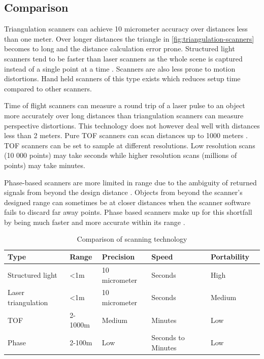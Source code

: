 \subsection{Comparison}

Triangulation scanners can achieve 10 micrometer accuracy over distances less than one meter. Over longer distances the triangle in \autoref{fig:triangulation-scanners} becomes to long and the distance calculation error prone. Structured light scanners tend to be faster than laser scanners as the whole scene is captured instead of a single point at a time \cite{Brown2012}. Scanners are also less prone to motion distortions. Hand held scanners of this type exists which reduces setup time compared to other scanners.

Time of flight scanners can measure a round trip of a laser pulse to an object more accurately over long distances than triangulation scanners can measure perspective distortions. This technology does not however deal well with distances less than 2 meters. Pure TOF scanners can scan distances up to 1000 meters \cite{Form2014}. TOF scanners can be set to sample at different resolutions. Low resolution scans (10 000 points) may take seconds while higher resolution scans (millions of points) may take minutes.

Phase-based scanners are more limited in range due to the ambiguity of returned signals from beyond the design distance \cite{Bhurtha}. Objects from beyond the scanner's designed range can sometimes be at closer distances when the scanner software fails to discard far away points. Phase based scanners make up for this shortfall by being much faster and more accurate within its range \cite{Form2014}.


\begin{table}
\begin{tabular}{ |l|l|l|l|l|l| }
  \hline
  Type &              Range &        Precision       & Speed & Portability \\
  \hline
  Structured light &    <1m     & 10 micrometer  & Seconds & High \\
  Laser triangulation & <1m     & 10 micrometer  & Seconds  & Medium \\     
  TOF &                 2-1000m & Medium      & Minutes & Low \\
  Phase &               2-100m & Low         & Seconds to Minutes & Low \\
  \hline  
\end{tabular}
\caption{Comparison of scanning technology}
\end{table}


